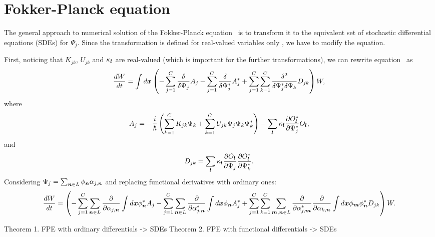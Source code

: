 \section{Fokker-Planck equation}

The general approach to numerical solution of the Fokker-Planck equation~ is to transform it to the equivalent set of stochastic differential equations (SDEs) for $\Psi_j$.
Since the transformation is defined for real-valued variables only ,
we have to modify the equation.

First, noticing that $K_{jk}$, $U_{jk}$ and $\kappa_{\boldsymbol{l}}$ are real-valued
(which is important for the further transformations),
we can rewrite equation~ as
\[
	\frac{dW}{dt}
	= \int d\boldsymbol{x} \left(
		- \sum_{j=1}^C \frac{\delta}{\delta \Psi_j} A_j
		- \sum_{j=1}^C \frac{\delta}{\delta \Psi_j^*} A_j^*
		+ \sum_{j=1}^C \sum_{k=1}^C \frac{\delta^2}{\delta \Psi_j^* \delta \Psi_k} D_{jk}
	\right) W,
\]
where
\[
	A_j = -\frac{i}{\hbar} \left(
			\sum_{k=1}^C K_{jk} \Psi_k
			+ \sum_{k=1}^C U_{jk} \Psi_j \Psi_k \Psi_k^*
		\right)
		- \sum_{\boldsymbol{l}} \kappa_{\boldsymbol{l}} \frac{\partial O_{\boldsymbol{l}}^*}{\partial \Psi_j^*} O_{\boldsymbol{l}},
\]
and
\[
	D_{jk} = \sum_{\boldsymbol{l}} \kappa_{\boldsymbol{l}}
		\frac{\partial O_{\boldsymbol{l}}}{\partial \Psi_j}
		\frac{\partial O_{\boldsymbol{l}}^*}{\partial \Psi_k^*}.
\]
Considering $\Psi_j = \sum_{\boldsymbol{n} \in L} \phi_{\boldsymbol{n}} \alpha_{j,\boldsymbol{n}}$ and replacing functional derivatives with ordinary ones:
\[
	\frac{dW}{dt}
	= \left(
		- \sum_{j=1}^C \sum_{\boldsymbol{n} \in L}
			\frac{\partial}{\partial \alpha_{j,\boldsymbol{n}}}
			\int d\boldsymbol{x} \phi_{\boldsymbol{n}}^* A_j
		- \sum_{j=1}^C \sum_{\boldsymbol{n} \in L}
			\frac{\partial}{\partial \alpha_{j,\boldsymbol{n}}^*}
			\int d\boldsymbol{x} \phi_{\boldsymbol{n}} A_j^*
		+ \sum_{j=1}^C \sum_{k=1}^C
			\sum_{\boldsymbol{m},\boldsymbol{n} \in L}
			\frac{\partial}{\partial \alpha_{j,\boldsymbol{m}}^*}
			\frac{\partial}{\partial \alpha_{k,\boldsymbol{n}}}
			\int d\boldsymbol{x}
			\phi_{\boldsymbol{m}} \phi_{\boldsymbol{n}}^* D_{jk}
	\right) W.
\]

Theorem 1. FPE with ordinary differentials -> SDEs
Theorem 2. FPE with functional differentials -> SDEs
